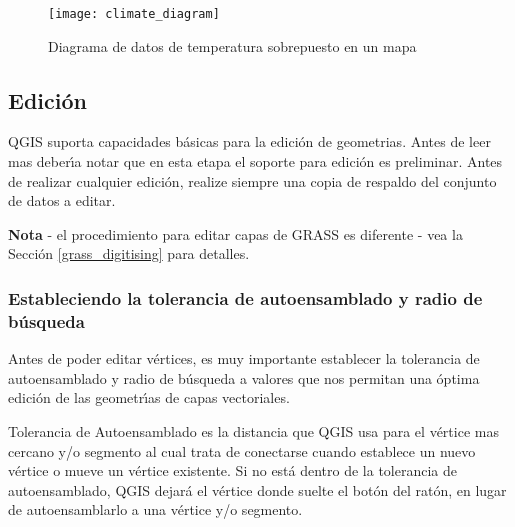 \begin{figure}[ht]
   \begin{center}
   \caption{Diagrama de datos de temperatura sobrepuesto en un mapa \nixcaption}\label{fig:climatediagram}\smallskip
   \texttt{[image: climate\_diagram]}
\end{center}
\end{figure}

\subsection{Edici\'on}

QGIS suporta capacidades b\'asicas para la edici\'on de geometrias.  Antes de leer mas
deber\'{\i}a notar que en esta etapa el soporte para edici\'on es preliminar.
Antes de realizar cualquier edici\'on, realize siempre una copia de respaldo del conjunto de datos
a editar. 

\textbf{Nota} - el procedimiento para editar capas de GRASS es diferente - vea la
Secci\'on \ref{grass_digitising} para detalles.

\subsubsection{Estableciendo la tolerancia de autoensamblado y radio de b\'usqueda}

Antes de poder editar v\'ertices, es muy importante establecer la tolerancia
de autoensamblado y radio de b\'usqueda a valores que nos permitan una \'optima edici\'on de
las geometr\'{\i}as de capas vectoriales. 


Tolerancia de Autoensamblado es la distancia que QGIS usa para  el v\'ertice
mas cercano y/o segmento al cual trata de conectarse
cuando establece un nuevo v\'ertice o mueve un v\'ertice existente. Si no est\'a dentro
de la tolerancia de autoensamblado, QGIS dejar\'a el v\'ertice donde suelte el
bot\'on del rat\'on, en lugar de autoensamblarlo a una v\'ertice y/o segmento. 

